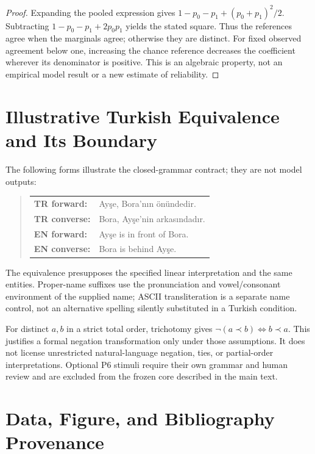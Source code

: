 \begin{proof}
Expanding the pooled expression gives $1 - p_0 - p_1 + (p_0 + p_1)^2/2$. Subtracting
$1 - p_0 - p_1 + 2 p_0 p_1$ yields the stated square. Thus the references agree when the marginals agree;
otherwise they are distinct. For fixed observed agreement below one, increasing the chance reference
decreases the coefficient wherever its denominator is positive. This is an algebraic property, not an
empirical model result or a new estimate of reliability.
\end{proof}

\section{Illustrative Turkish Equivalence and Its Boundary}
\label{app:equivalence}

The following forms illustrate the closed-grammar contract; they are not model outputs:

\begin{quote}
\begin{tabular}{@{}ll@{}}
  \textbf{TR forward:} & Ayşe, Bora'nın önündedir. \\
  \textbf{TR converse:} & Bora, Ayşe'nin arkasındadır. \\
  \textbf{EN forward:} & Ayşe is in front of Bora. \\
  \textbf{EN converse:} & Bora is behind Ayşe. \\
\end{tabular}
\end{quote}

The equivalence presupposes the specified linear interpretation and the same entities. Proper-name suffixes
use the pronunciation and vowel/consonant environment of the supplied name; ASCII transliteration is a
separate name control, not an alternative spelling silently substituted in a Turkish condition.

For distinct $a, b$ in a strict total order, trichotomy gives $\lnot(a \prec b) \Leftrightarrow b \prec a$.
This justifies a formal negation transformation only under those assumptions. It does not license
unrestricted natural-language negation, ties, or partial-order interpretations. Optional P6 stimuli require
their own grammar and human review and are excluded from the frozen core described in the main text.

\section{Data, Figure, and Bibliography Provenance}
\label{app:provenance}


